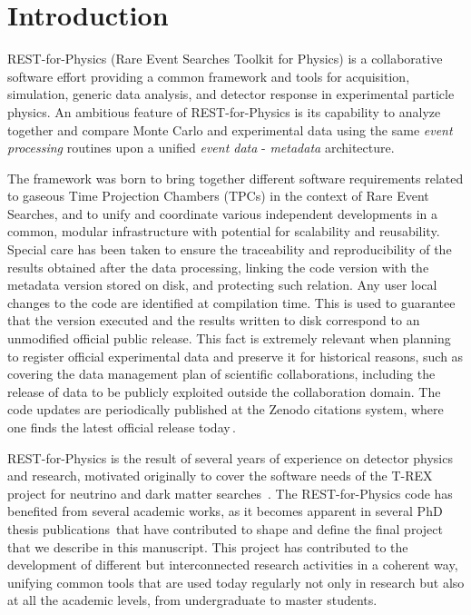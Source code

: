 \section{Introduction}
\label{sec:intro}

REST-for-Physics (Rare Event Searches Toolkit for Physics) is a collaborative software effort providing a common framework and tools for acquisition, simulation, generic data analysis, and detector response in experimental particle physics. An ambitious feature of REST-for-Physics is its capability to analyze together and compare Monte Carlo and experimental data using the same \emph{event processing} routines upon a unified \emph{event data} - \emph{metadata} architecture. 

The framework was born to bring together different software requirements related to gaseous Time Projection Chambers (TPCs) in the context of Rare Event Searches, and to unify and coordinate various independent developments in a common, modular infrastructure with potential for scalability and reusability. Special care has been taken to ensure the traceability and reproducibility of the results obtained after the data processing, linking the code version with the metadata version stored on disk, and protecting such relation. Any user local changes to the code are identified at compilation time. This is used to guarantee that the version executed and the results written to disk correspond to an unmodified official public release. This fact is extremely relevant when planning to register official experimental data and preserve it for historical reasons, such as covering the data management plan of scientific collaborations, including the release  of data to be publicly exploited outside the collaboration domain. The code updates are periodically published at the Zenodo citations system, where one finds the latest official release today\,\cite{javier_galan_2021_5092550}.

REST-for-Physics is the result of several years of experience on detector physics and research, motivated originally to cover the software needs of the T-REX project for neutrino and dark matter searches~\cite{Irastorza:2015dcb,Irastorza:2015geo}. The REST-for-Physics code has benefited from several academic works, as it becomes apparent in several PhD thesis publications\,\cite{IguazThesis,tomas2013development,SeguiThesis,HerreraThesis,GraciaThesis, GarciaPascualThesis, RuizThesis} that have contributed to shape and define the final project that we describe in this manuscript.
This project has contributed to the development of different but interconnected research activities in a coherent way, unifying common tools that are used today regularly not only in research but also at all the academic levels, from undergraduate to master students. 

